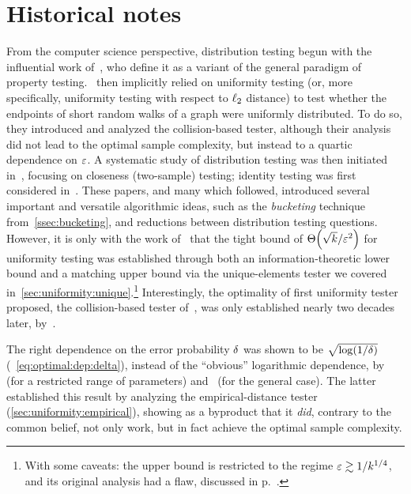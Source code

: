 \section{Historical notes}
From the computer science perspective, distribution testing begun with the influential work of~\citet{GoldreichGR98}, who define it as a variant of the general paradigm of property testing.~\citet{GoldreichR00} then implicitly relied on uniformity testing (or, more specifically, uniformity testing with respect to $\lp[2]$ distance) to test whether the endpoints of short random walks of a graph were uniformly distributed. To do so, they introduced and analyzed the collision-based tester, although their analysis did not lead to the optimal sample complexity, but instead to a quartic dependence on $\dst$. A systematic study of distribution testing was then initiated in~\citet{BatuFRSW00}, focusing on closeness (two-sample) testing; identity testing was first considered in~\citet{BFFKRW:01}. These papers, and many which followed, introduced several important and versatile algorithmic ideas, such as the \emph{bucketing} technique from~\cref{ssec:bucketing}, and reductions between distribution testing questions. However, it is only with the work of~\citet{Paninski08} that the tight bound of $\bigTheta{\sqrt{\ab}/\dst^2}$ for uniformity testing was established through both an information-theoretic lower bound and a matching upper bound via the unique-elements tester we covered in~\cref{sec:uniformity:unique}.\footnote{With some caveats: the upper bound is restricted to the regime $\dst \gtrsim1/\ab^{1/4}$, and its original analysis had a flaw, discussed in p.~\pageref{note:paninski:flaw}.} Interestingly, the optimality of first uniformity tester proposed, the collision-based tester of~\citet{GoldreichR00}, was only established nearly two decades later, by~\citet{DiakonikolasGPP19}.

The right dependence on the error probability $\errprob$ was shown to be $\sqrt{\log(1/\errprob)}$ (\cf~\cref{eq:optimal:dep:delta}), instead of the ``obvious'' logarithmic dependence, by~\citet{HuangM13} (for a restricted range of parameters) and~\citet{DiakonikolasGPP18} (for the general case). The latter established this result by analyzing the empirical-distance tester (\cref{sec:uniformity:empirical}), showing as a byproduct that it \emph{did}, contrary to the common belief, not only work, but in fact achieve the optimal sample complexity.

